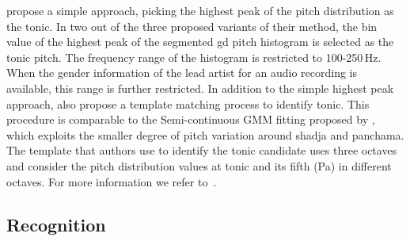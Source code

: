 {\cite{Ashwin_Istanbul2012} propose a simple approach, picking the highest peak of the pitch distribution as the tonic. In two out of the three proposed variants of their method, the bin value of the highest peak of the segmented \gls{gd} pitch histogram is selected as the tonic pitch. The frequency range of the histogram is restricted to 100-250\,Hz. When the gender information of the lead artist for an audio recording is available, this range is further restricted. In addition to the simple highest peak approach, \cite{Ashwin_Istanbul2012} also propose a template matching process to identify tonic. This procedure is comparable to the Semi-continuous GMM fitting proposed by \cite{Ranjani2011}, which exploits the smaller degree of pitch variation around \gls{shadja} and panchama. The template that authors use to identify the tonic candidate uses three octaves and consider the pitch distribution values at tonic and its fifth (Pa) in different octaves. For more information we refer to~\cite{Gulati2014Tonic}.




\subsection{ Recognition}
\label{sec:sota_raga_recognition}



}
